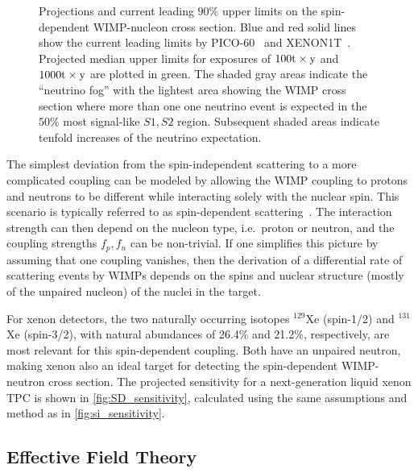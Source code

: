 \begin{figure}[!htbp]
    \caption{Projections and current leading $90\%$ upper limits on the spin-dependent WIMP-nucleon cross section. Blue and red solid lines show the current leading limits by PICO-60~\cite{Amole:2017dex} and XENON1T~\cite{Aprile:2018dbl,Aprile:2019xxb}. Projected median upper limits for exposures of $100\mathrm{t}\times\mathrm{y}$ and $1000\mathrm{t}\times\mathrm{y}$ are plotted in green. The shaded gray areas indicate the ``neutrino fog'' with the lightest area showing the WIMP cross section where more than one one neutrino event is expected in the $50\%$ most signal-like $S1,S2$ region. Subsequent shaded areas indicate tenfold increases of the neutrino expectation.}
\label{fig:SD_sensitivity}
\end{figure}

The simplest deviation from the spin-independent scattering to a more complicated coupling can be modeled by allowing the WIMP coupling to protons and neutrons to be different while interacting solely with the nuclear spin. This scenario is typically referred to as spin-dependent scattering~\cite{Engel:1992bf,Tovey:2000mm}. The interaction strength can then depend on the nucleon type, i.e.~proton or neutron, and the coupling strengths $f_p, f_n$ can be non-trivial. If one simplifies this picture by assuming that one coupling vanishes, then the derivation of a differential rate of scattering events by WIMPs depends on the spins and nuclear structure (mostly of the unpaired nucleon) of the nuclei in the target. 

For xenon detectors, the two naturally occurring isotopes $^{129}$Xe (spin-1/2) and $^{131}$Xe (spin-3/2), with natural abundances of 26.4\% and 21.2\%, respectively, are most relevant for this spin-dependent coupling. Both have an unpaired neutron, making xenon also an ideal target for detecting the spin-dependent WIMP-neutron cross section. The projected sensitivity for a next-generation liquid xenon TPC is shown in \autoref{fig:SD_sensitivity}, calculated using the same assumptions and method as in \autoref{fig:si_sensitivity}.

\subsection{Effective Field Theory}\label{sec:eft}


